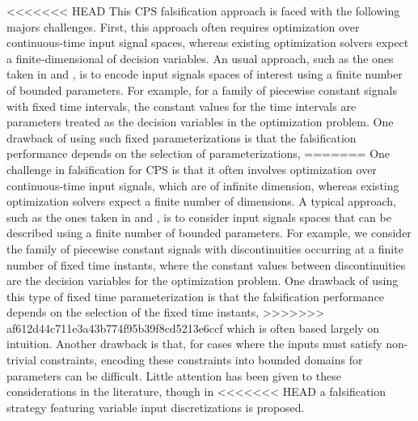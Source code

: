 <<<<<<< HEAD
This CPS falsification approach is faced with the following majors challenges.
First, this approach often
requires optimization over continuous-time input signal spaces, whereas
existing optimization solvers expect a finite-dimensional of decision variables. 
An usual approach, such as the ones taken in \cite{BreachCAV10} and 
\cite{Nghiem10}, is to encode input signals spaces of interest using a
finite number of bounded parameters. For example, for a family of
piecewise constant signals with fixed time intervals, the
constant values for the time intervals are parameters treated as the decision variables in the optimization
problem. One drawback of using such fixed parameterizations 
is that the falsification performance depends on the selection of parameterizations, 
=======
One challenge in falsification for CPS is that it often
involves optimization over continuous-time input signals, which are of infinite 
dimension, whereas existing optimization solvers expect a finite number of 
dimensions. 
A typical approach, such as the ones taken in \cite{BreachCAV10} and 
\cite{Nghiem10}, is to consider input signals spaces that can be described using a
finite number of bounded parameters. For example, we consider the family of
piecewise constant signals with discontinuities occurring at a finite number of fixed time instants, where the
constant values between discontinuities are the decision variables for the optimization
problem. One drawback of using this type of fixed time parameterization 
is that the falsification performance depends on the selection of the fixed time instants, 
>>>>>>> af612d44c711e3a43b774f95b39f8cd5213e6ccf
which is often based largely on intuition. Another drawback is that, for cases where the
inputs must satisfy non-trivial constraints, encoding these constraints 
into bounded domains for parameters can be difficult. Little attention has
been given to these considerations in the literature, though in 
<<<<<<< HEAD
\cite{DBLP:conf/atva/DeshmukhJKM15} a
falsification strategy featuring variable input discretizations is proposed.

